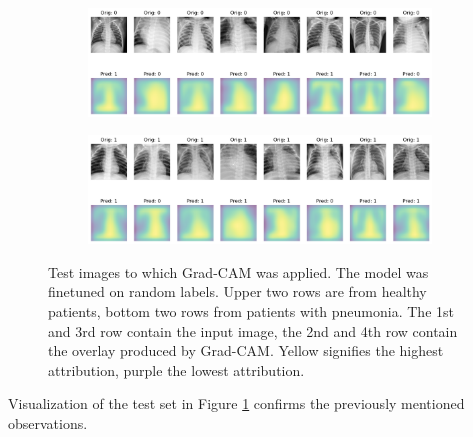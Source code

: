 \begin{figure}
    \centering
    \begin{subfigure}{\columnwidth}
        \includegraphics[width=1\textwidth]{images/gc_rand_test.png}
    \end{subfigure}
    \centering
    \begin{subfigure}{\columnwidth}
        \includegraphics[width=1\textwidth]{images/gc_rand_test_P.png}
    \end{subfigure}
    \caption{Test images to which Grad-CAM was applied. The model was finetuned on random labels. Upper two rows are from healthy patients, bottom two rows from patients with pneumonia. The 1st and 3rd row contain the input image, the 2nd and 4th row contain the overlay produced by Grad-CAM. Yellow signifies the highest attribution, purple the lowest attribution.}
    \label{fig:gc_rand_test}
\end{figure}


Visualization of the test set in Figure \ref{fig:gc_rand_test} confirms the previously mentioned observations.